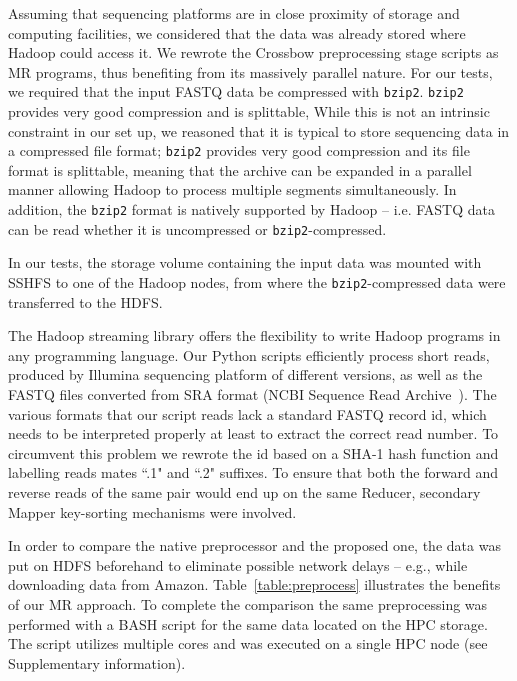 \documentclass[10pt]{article}
\newcommand{\COMMENT}[1]{{\color{red} #1 }}
\newcommand{\COM}[1]{{\color{blue} #1 }}
\begin{document}

Assuming that sequencing platforms are in close proximity of storage and
computing facilities, we considered that the data was already stored where
Hadoop could access it.
We rewrote the Crossbow preprocessing stage scripts as MR programs, thus
benefiting from its massively parallel nature.  For our tests, we required that
the input FASTQ data be compressed with \texttt{bzip2}.
\texttt{bzip2} provides very good compression and is splittable,
While this is not an
intrinsic constraint in our set up, we reasoned that it is typical to store
sequencing data in a compressed file format; \texttt{bzip2} provides very good
compression and its file format is splittable,
meaning that the archive can be expanded in a parallel manner allowing Hadoop to process multiple segments simultaneously.
In addition, the \texttt{bzip2} format is natively supported by Hadoop -- i.e. FASTQ data can be read whether it is uncompressed or \texttt{bzip2}-compressed.

In our tests, the storage volume containing the input data was mounted with SSHFS to one of the Hadoop nodes, from where the \texttt{bzip2}-compressed data were transferred to the HDFS.


The Hadoop streaming library offers the flexibility to write Hadoop programs in any programming language. Our Python scripts efficiently process short reads, produced by Illumina sequencing platform of different versions, as well as the FASTQ files converted from SRA format (NCBI Sequence Read Archive~\cite{ncbi-sra}).
The various formats that our script reads lack a standard FASTQ record id, which needs to be interpreted properly at least to extract the correct read number.  To circumvent this problem we rewrote the id based on a SHA-1 hash function and labelling reads mates ``.1" and ``.2" suffixes.
To ensure that both the forward and reverse reads of the same pair would end up on the same Reducer, secondary Mapper key-sorting mechanisms were involved.

In order to compare the native preprocessor and the proposed one, the data was put on HDFS beforehand to eliminate possible network delays -- e.g., while downloading data from Amazon.
Table~\ref{table:preprocess} illustrates the benefits of our MR approach.
To complete the comparison the same preprocessing was performed with a BASH script for the same data located on the HPC storage. The script utilizes multiple cores and was executed on a single HPC node (see Supplementary information).
\end{document}
